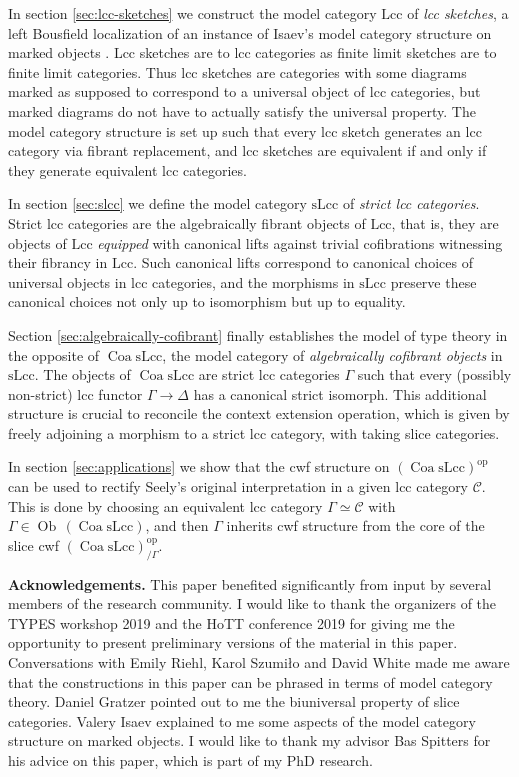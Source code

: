 \documentclass[a4paper]{article}
\theoremstyle{remark}
\theoremstyle{definition}
\begin{document}
In section \ref{sec:lcc-sketches} we construct the model category $\mathrm{Lcc}$ of \emph{lcc sketches}, a left Bousfield localization of an instance of Isaev's model category structure on marked objects \citep{marked-objects}.
Lcc sketches are to lcc categories as finite limit sketches are to finite limit categories.
Thus lcc sketches are categories with some diagrams marked as supposed to correspond to a universal object of lcc categories, but marked diagrams do not have to actually satisfy the universal property.
The model category structure is set up such that every lcc sketch generates an lcc category via fibrant replacement, and lcc sketches are equivalent if and only if they generate equivalent lcc categories.

In section \ref{sec:slcc} we define the model category $\mathrm{sLcc}$ of \emph{strict lcc categories}.
Strict lcc categories are the algebraically fibrant objects of $\mathrm{Lcc}$, that is, they are objects of $\mathrm{Lcc}$ \emph{equipped} with canonical lifts against trivial cofibrations witnessing their fibrancy in $\mathrm{Lcc}$.
Such canonical lifts correspond to canonical choices of universal objects in lcc categories, and the morphisms in $\mathrm{sLcc}$ preserve these canonical choices not only up to isomorphism but up to equality.

Section \ref{sec:algebraically-cofibrant} finally establishes the model of type theory in the opposite of $\operatorname{Coa} \mathrm{sLcc}$, the model category of \emph{algebraically cofibrant objects} in $\mathrm{sLcc}$.
The objects of $\operatorname{Coa} \mathrm{sLcc}$ are strict lcc categories $\Gamma$ such that every (possibly non-strict) lcc functor $\Gamma \rightarrow \Delta$ has a canonical strict isomorph.
This additional structure is crucial to reconcile the context extension operation, which is given by freely adjoining a morphism to a strict lcc category, with taking slice categories.

In section \ref{sec:applications} we show that the cwf structure on $(\operatorname{Coa} \mathrm{sLcc})^\mathrm{op}$ can be used to rectify Seely's original interpretation in a given lcc category $\mathcal{C}$.
This is done by choosing an equivalent lcc category $\Gamma \simeq \mathcal{C}$ with $\Gamma \in \operatorname{Ob} \, (\operatorname{Coa} \mathrm{sLcc})$, and then $\Gamma$ inherits cwf structure from the core of the slice cwf $(\operatorname{Coa} \mathrm{sLcc})^\mathrm{op}_{ / \Gamma}$.

\textbf{Acknowledgements.}
This paper benefited significantly from input by several members of the research community.
I would like to thank the organizers of the TYPES workshop 2019 and the HoTT conference 2019 for giving me the opportunity to present preliminary versions of the material in this paper.
Conversations with Emily Riehl, Karol Szumiło and David White made me aware that the constructions in this paper can be phrased in terms of model category theory.
Daniel Gratzer pointed out to me the biuniversal property of slice categories.
Valery Isaev explained to me some aspects of the model category structure on marked objects.
I would like to thank my advisor Bas Spitters for his advice on this paper, which is part of my PhD research.
\end{document}
